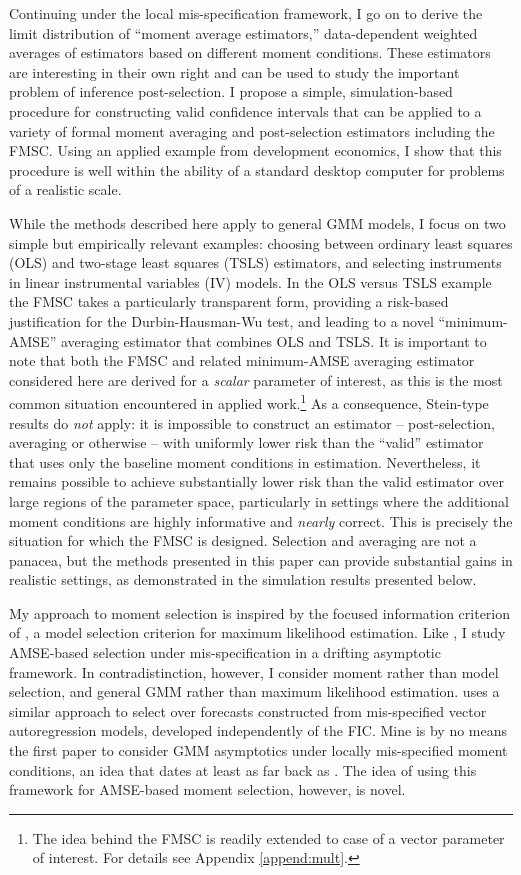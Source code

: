 Continuing under the local mis-specification framework, I go on to derive the limit distribution of ``moment average estimators,'' data-dependent weighted averages of estimators based on different moment conditions.
These estimators are interesting in their own right and can be used to study the important problem of inference post-selection.
I propose a simple, simulation-based procedure for constructing valid confidence intervals that can be applied to a variety of formal moment averaging and post-selection estimators including the FMSC.
Using an applied example from development economics, I show that this procedure is well within the ability of a standard desktop computer for problems of a realistic scale.

While the methods described here apply to general GMM models, I focus on two simple but empirically relevant examples: choosing between ordinary least squares (OLS) and two-stage least squares (TSLS) estimators, and selecting instruments in linear instrumental variables (IV) models. 
In the OLS versus TSLS example the FMSC takes a particularly transparent form, providing a risk-based justification for the Durbin-Hausman-Wu test, and leading to a novel ``minimum-AMSE'' averaging estimator that combines OLS and TSLS.
It is important to note that both the FMSC and related minimum-AMSE averaging estimator considered here are derived for a \emph{scalar} parameter of interest, as this is the most common situation encountered in applied work.\footnote{The idea behind the FMSC is readily extended to case of a vector parameter of interest. For details see Appendix \ref{append:mult}.}
As a consequence, Stein-type results do \emph{not} apply: it is impossible to construct an estimator -- post-selection, averaging or otherwise -- with uniformly lower risk than the ``valid'' estimator that uses only the baseline moment conditions in estimation.
Nevertheless, it remains possible to achieve substantially lower risk than the valid estimator over large regions of the parameter space, particularly in settings where the additional moment conditions are highly informative and \emph{nearly} correct.
This is precisely the situation for which the FMSC is designed.
Selection and averaging are not a panacea, but the methods presented in this paper can provide substantial gains in realistic settings, as demonstrated in the simulation results presented below.

My approach to moment selection is inspired by the focused information criterion of \citet{ClaeskensHjort2003}, a model selection criterion for maximum likelihood estimation. 
Like \citet{ClaeskensHjort2003}, I study AMSE-based selection under mis-specification in a drifting asymptotic framework. 
In contradistinction, however, I consider moment rather than model selection, and general GMM rather than maximum likelihood estimation.
\cite{Schorfheide2005} uses a similar approach to select over forecasts constructed from mis-specified vector autoregression models, developed independently of the FIC. 
Mine is by no means the first paper to consider GMM asymptotics under locally mis-specified moment conditions, an idea that dates at least as far back as \cite{Newey1985}.
The idea of using this framework for AMSE-based moment selection, however, is novel.

